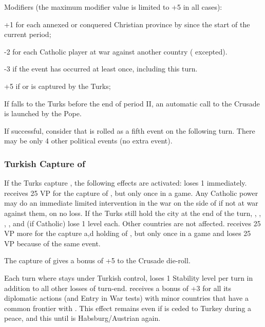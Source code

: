 \bparag Modifiers (the maximum modifier value is limited to +5 in all cases):
\begin{modlist}
\item[+1] for each annexed or conquered Christian province by \TUR since the
  start of the current period;
\item[-2] for each Catholic player at war against another country (\TUR
  excepted).
\item[-3] if the event  has occurred at least once,
  including this turn.
\item[+5] if  or  is captured by the Turks;
\end{modlist}
\bparag If  falls to the Turks before the end of period II, an
automatic call to the Crusade is launched by the Pope.

\aparag If successful, consider that  is rolled as a
fifth event on the following turn. There may be only 4 other political events
(no extra event).


\subsubsection{Turkish Capture of }\label{chSpecific:Fall
  Vienna}
\aparag If the Turks capture , the following effects are
activated:
\bparag \HAB loses 1 \STAB immediately. \TUR receives 25 VP for the capture of
, but only once in a game.
\bparag Any Catholic power may do an immediate limited intervention in the war
on the side of \HAB if not at war against them, on no \STAB loss.
\bparag If the Turks still hold the city at the end of the turn, \VEN, \FRA,
\ENG, \SPA, \AUT and \POL (if Catholic) lose 1 \STAB level each.  Other
countries are not affected.  \TUR receives 25 VP more for the capture a,d
holding of , but only once in a game and \HAB loses 25 VP
because of the same event.

The capture of  gives a bonus of +5 to the Crusade die-roll.

Each turn where  stays under Turkish control, \HAB loses 1
Stability level per turn in addition to all other losses of turn-end.
\bparag \MAJHAB receives a bonus of +3 for all its diplomatic actions (and
Entry in War tests) with minor countries that have a common frontier with
\AUSaus. This effect remains even if  is ceded to Turkey during
a peace, and this until  is Habsburg/Austrian again.

